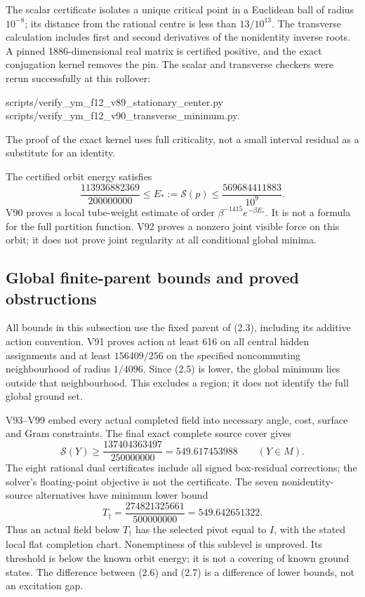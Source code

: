 \documentclass[11pt,oneside]{article}
\newcommand{\cS}{\mathcal S}
\begin{document}
The scalar certificate isolates a unique critical
point in a Euclidean ball of radius \(10^{-8}\);
its distance from the rational centre is less than
\(13/10^{13}\). The transverse calculation includes
first and second derivatives of the nonidentity
inverse roots. A pinned 1886-dimensional real
matrix is certified positive, and the exact
conjugation kernel removes the pin. The scalar
and transverse checkers were rerun successfully
at this rollover:
\begin{center}\small\ttfamily
scripts/verify\_ym\_f12\_v89\_stationary\_center.py\\
scripts/verify\_ym\_f12\_v90\_transverse\_minimum.py.
\end{center}
The proof of the exact kernel uses full criticality,
not a small interval residual as a substitute for
an identity.

The certified orbit energy satisfies
\[
 \frac{113936882369}{200000000}
 \le E_*:=\cS(p)\le
 \frac{569684411883}{10^9}.
 \tag{2.5}
\]
V90 proves a local tube-weight estimate of order
\(\beta^{-1415}e^{-\beta E_*}\). It is not a
formula for the full partition function. V92
proves a nonzero joint visible force on this
orbit; it does not prove joint regularity at
all conditional global minima.

\subsection{Global finite-parent bounds and proved obstructions}

All bounds in this subsection use the fixed parent
of (2.3), including its additive action convention.
V91 proves action at least 616 on all central
hidden assignments and at least \(156409/256\)
on the specified noncommuting neighbourhood of
radius \(1/4096\). Since (2.5) is lower, the
global minimum lies outside that neighbourhood.
This excludes a region; it does not identify
the full global ground set.

V93--V99 embed every actual completed field into
necessary angle, cost, surface and Gram constraints.
The final exact complete source cover gives
\[
 \cS(Y)\ge \frac{137404363497}{250000000}
                  =549.617453988
                  \qquad(Y\in M).
 \tag{2.6}
\]
The eight rational dual certificates include
all signed box-residual corrections; the solver's
floating-point objective is not the certificate.
The seven nonidentity-source alternatives have
minimum lower bound
\[
 T_\dagger=\frac{274821325661}{500000000}
                            =549.642651322.
 \tag{2.7}
\]
Thus an actual field below \(T_\dagger\) has the
selected pivot equal to \(I\), with the stated
local flat completion chart. Nonemptiness of this
sublevel is unproved. Its threshold is below
the known orbit energy; it is not a covering
of known ground states. The difference between
(2.6) and (2.7) is a difference of lower bounds,
not an excitation gap.
\end{document}
